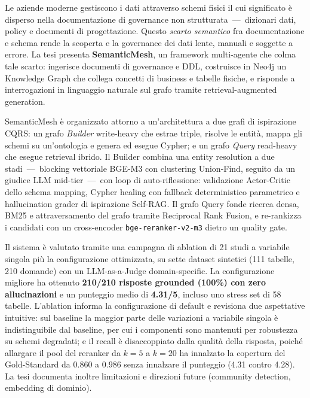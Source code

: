 
\begingroup
\setlength{\parindent}{0pt}
\setlength{\parskip}{\baselineskip}

Le aziende moderne gestiscono i dati attraverso schemi fisici il cui significato è disperso nella documentazione di governance non strutturata~---~dizionari dati, policy e documenti di progettazione. Questo \emph{scarto semantico} fra documentazione e schema rende la scoperta e la governance dei dati lente, manuali e soggette a errore. La tesi presenta \textbf{SemanticMesh}, un framework multi-agente che colma tale scarto: ingerisce documenti di governance e DDL, costruisce in Neo4j un Knowledge Graph che collega concetti di business e tabelle fisiche, e risponde a interrogazioni in linguaggio naturale sul grafo tramite retrieval-augmented generation.

SemanticMesh è organizzato attorno a un'architettura a due grafi di ispirazione CQRS: un grafo \emph{Builder} write-heavy che estrae triple, risolve le entità, mappa gli schemi su un'ontologia e genera ed esegue Cypher; e un grafo \emph{Query} read-heavy che esegue retrieval ibrido. Il Builder combina una entity resolution a due stadi~---~blocking vettoriale BGE-M3 con clustering Union-Find, seguito da un giudice LLM mid-tier~---~con loop di auto-riflessione: validazione Actor-Critic dello schema mapping, Cypher healing con fallback deterministico parametrico e hallucination grader di ispirazione Self-RAG. Il grafo Query fonde ricerca densa, BM25 e attraversamento del grafo tramite Reciprocal Rank Fusion, e re-rankizza i candidati con un cross-encoder \texttt{bge-reranker-v2-m3} dietro un quality gate.

Il sistema è valutato tramite una campagna di ablation di 21 studi a variabile singola più la configurazione ottimizzata, su sette dataset sintetici (111 tabelle, 210 domande) con un LLM-as-a-Judge domain-specific. La configurazione migliore ha ottenuto \textbf{210/210 risposte grounded (100\%) con zero allucinazioni} e un punteggio medio di \textbf{4.31/5}, incluso uno stress set di 58 tabelle. L'ablation informa la configurazione di default e revisiona due aspettative intuitive: sul baseline la maggior parte delle variazioni a variabile singola è indistinguibile dal baseline, per cui i componenti sono mantenuti per robustezza su schemi degradati; e il recall è disaccoppiato dalla qualità della risposta, poiché allargare il pool del reranker da $k{=}5$ a $k{=}20$ ha innalzato la copertura del Gold-Standard da $0.860$ a $0.986$ senza innalzare il punteggio (4.31 contro 4.28). La tesi documenta inoltre limitazioni e direzioni future (community detection, embedding di dominio).

\endgroup
